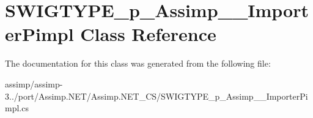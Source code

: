 \hypertarget{class_s_w_i_g_t_y_p_e__p___assimp_____importer_pimpl}{\section{S\+W\+I\+G\+T\+Y\+P\+E\+\_\+p\+\_\+\+Assimp\+\_\+\+\_\+\+Importer\+Pimpl Class Reference}
\label{class_s_w_i_g_t_y_p_e__p___assimp_____importer_pimpl}
}


The documentation for this class was generated from the following file\+:\begin{DoxyCompactItemize}
\item 
assimp/assimp-\/3../port/\+Assimp.\+N\+E\+T/\+Assimp.\+N\+E\+T\+\_\+\+C\+S/S\+W\+I\+G\+T\+Y\+P\+E\+\_\+p\+\_\+\+Assimp\+\_\+\+\_\+\+Importer\+Pimpl.\+cs\end{DoxyCompactItemize}

